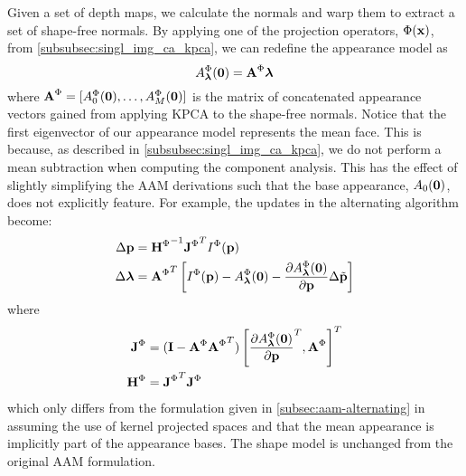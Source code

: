 Given a set of depth maps, we calculate the normals and warp them to extract
a set of shape-free normals. By applying one of the projection operators,
$\Phi(\boldsymbol{\mathbf{x}})$, from \cref{subsubsec:singl_img_ca_kpca}, we can
redefine the appearance model as
\begin{equation}\label{eq:aam-kernel-appearance-model}
    A_{\boldsymbol{\mathbf{\lambda}}}^{\Phi}(\boldsymbol{\mathbf{0}}) = \boldsymbol{\mathbf{A}}^{\Phi} \boldsymbol{\mathbf{\lambda}}
\end{equation}
where $\boldsymbol{\mathbf{A}}^{\Phi} = [A_0^{\Phi}(\boldsymbol{\mathbf{0}}), \ldots, A_M^{\Phi}(\boldsymbol{\mathbf{0}})]$
is the matrix of concatenated appearance vectors gained from applying KPCA to
the shape-free normals. Notice that the first eigenvector of our appearance
model represents the mean face. This is because, as described in
\cref{subsubsec:singl_img_ca_kpca}, we do not perform a mean subtraction
when computing the component analysis. This has the effect of slightly
simplifying the AAM derivations such that the base appearance, $A_0(\boldsymbol{\mathbf{0}})$,
does not explicitly feature. For example, the updates in the alternating
algorithm become:
\begin{equation}
    \begin{aligned}\label{eq:aam-kernel-alternating-update}
        \Delta \boldsymbol{\mathbf{p}}       &= {\boldsymbol{\mathbf{H}}^{\Phi}}^{-1} {\boldsymbol{\mathbf{J}}^{\Phi}}^{T} I^{\Phi}(\boldsymbol{\mathbf{p}}) \\
        \Delta \boldsymbol{\mathbf{\lambda}} &= {\boldsymbol{\mathbf{A}}^{\Phi}}^T \left[ I^{\Phi}(\boldsymbol{\mathbf{p}}) - A^{\Phi}_{\boldsymbol{\mathbf{\lambda}}}(\boldsymbol{\mathbf{0}}) - \frac{\partial A^{\Phi}_{\boldsymbol{\mathbf{\lambda}}}(\boldsymbol{\mathbf{0}})}{\partial \boldsymbol{\mathbf{p}}} \Delta \tilde{\boldsymbol{\mathbf{p}}} \right]
    \end{aligned}
\end{equation}
where 
\begin{equation*}
    \begin{aligned}
        \boldsymbol{\mathbf{J}}^{\Phi} &= (\boldsymbol{\mathbf{I}} - \boldsymbol{\mathbf{A}}^{\Phi} {\boldsymbol{\mathbf{A}}^{\Phi}}^T) \left[ {\frac{\partial A^{\Phi}_{\boldsymbol{\mathbf{\lambda}}}(\boldsymbol{\mathbf{0}})}{\partial \boldsymbol{\mathbf{p}}}}^T, \boldsymbol{\mathbf{A}}^{\Phi} \right]^T \\
        \boldsymbol{\mathbf{H}}^{\Phi} &= {\boldsymbol{\mathbf{J}}^{\Phi}}^{T} \boldsymbol{\mathbf{J}}^{\Phi}
    \end{aligned}
\end{equation*}
which only differs from the formulation given in \cref{subsec:aam-alternating} in assuming the use of kernel projected spaces and that the mean
appearance is implicitly part of the appearance bases. The shape model is
unchanged from the original AAM formulation.

